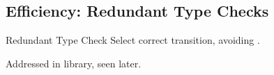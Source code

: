 \subsection{Efficiency: Redundant Type Checks}

{  %

\begin{frame}{ Redundant Type Check}
  Select correct transition, avoiding .

  \medskip

  \scalebox{0.85}{}

  \medskip
  
  Addressed in  library, seen later.
\end{frame}
}


\newsavebox\typecaseAbox
\begin{lrbox}{\typecaseAbox}
  \begin{minipage}{8cm}
    
  \end{minipage}
\end{lrbox}

\newsavebox\typecaseITEbox
\begin{lrbox}{\typecaseITEbox}
  \begin{minipage}{8cm}
    
  \end{minipage}
\end{lrbox}

\newsavebox\typecaseITEafterbox
\begin{lrbox}{\typecaseITEafterbox}
  \begin{minipage}{8cm}

  \end{minipage}
\end{lrbox}

\newsavebox\typecaseBabox
\begin{lrbox}{\typecaseBabox}
  \begin{minipage}{8cm}

  \end{minipage}
\end{lrbox}

\newsavebox\typecaseBaabox
\begin{lrbox}{\typecaseBaabox}
  \begin{minipage}{8cm}

  \end{minipage}
\end{lrbox}

\newsavebox\typecaseBbox
\begin{lrbox}{\typecaseBbox}
  \begin{minipage}{8cm}
    
  \end{minipage}
\end{lrbox}

